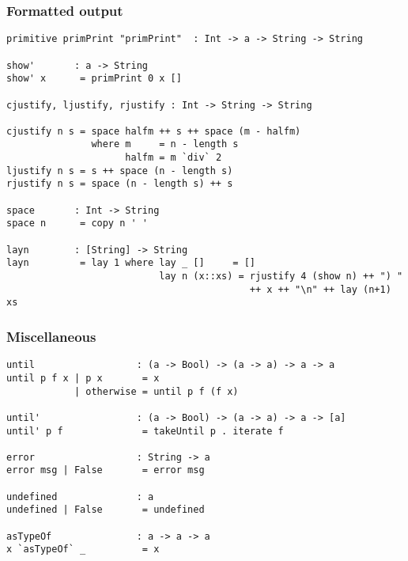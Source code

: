 \subsubsection*{Formatted output}
\begin{verbatim}
primitive primPrint "primPrint"  : Int -> a -> String -> String

show'       : a -> String
show' x      = primPrint 0 x []

cjustify, ljustify, rjustify : Int -> String -> String

cjustify n s = space halfm ++ s ++ space (m - halfm)
               where m     = n - length s
                     halfm = m `div` 2
ljustify n s = s ++ space (n - length s)
rjustify n s = space (n - length s) ++ s

space       : Int -> String
space n      = copy n ' '

layn        : [String] -> String
layn         = lay 1 where lay _ []     = []
                           lay n (x::xs) = rjustify 4 (show n) ++ ") "
                                           ++ x ++ "\n" ++ lay (n+1) xs
\end{verbatim}
\subsubsection*{Miscellaneous}
\begin{verbatim}
until                  : (a -> Bool) -> (a -> a) -> a -> a
until p f x | p x       = x
            | otherwise = until p f (f x)

until'                 : (a -> Bool) -> (a -> a) -> a -> [a]
until' p f              = takeUntil p . iterate f

error                  : String -> a
error msg | False       = error msg

undefined              : a
undefined | False       = undefined

asTypeOf               : a -> a -> a
x `asTypeOf` _          = x
\end{verbatim}

